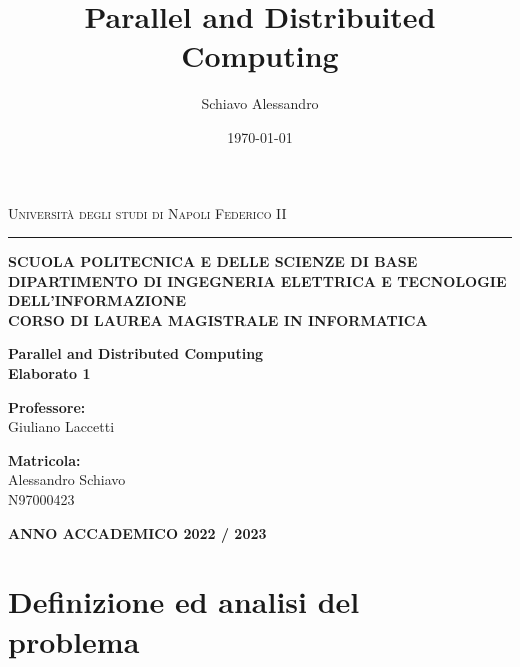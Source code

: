 \documentclass[a4paper,11pt]{book}
\title{Parallel and Distribuited Computing}
\author{Schiavo Alessandro}
\date{\today}
\begin{document}
\begin{titlepage}
    \begin{center}
        {{\Large
        {\textsc{Università degli studi di Napoli Federico II}}}} 
        \rule[0.1cm]{15.8cm}{0.1mm}
        {\small{\bf SCUOLA POLITECNICA E DELLE SCIENZE DI BASE\\  \vspace{3mm}
        DIPARTIMENTO DI INGEGNERIA ELETTRICA E TECNOLOGIE
DELL’INFORMAZIONE \\  \vspace{3mm}
CORSO DI LAUREA MAGISTRALE IN INFORMATICA}}
    \end{center}
    \vspace{15mm}
    \begin{center}
        {\LARGE{\bf Parallel and Distributed Computing }}\\
        \vspace{3mm}
        {\LARGE{\bf Elaborato 1}}\\
    \end{center}
    \vspace{40mm}
    \par
    \noindent
    \begin{minipage}[t]{0.47\textwidth}
        {\large{\bf Professore:}\\Giuliano Laccetti}
    \end{minipage}
    \hfill
    \begin{minipage}[t]{0.47\textwidth}
        \raggedleft
        {\large{\bf Matricola:}\\ Alessandro Schiavo \\N97000423}
    \end{minipage}
    \vspace{20mm}
    \begin{center}
        {\large{\bf ANNO ACCADEMICO 2022 / 2023 }}
    \end{center}
\end{titlepage}

\tableofcontents

\chapter{Definizione ed analisi del \\ problema}
\end{document}
